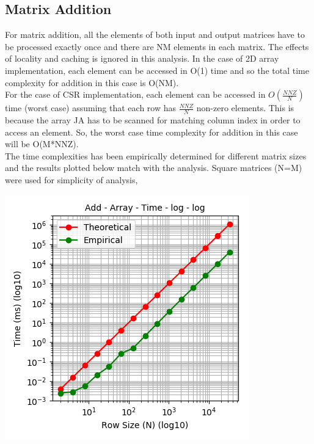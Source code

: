 \documentclass[11pt,a4paper,oneside]{article}
\begin{document}
    \subsection{Matrix Addition}
    For matrix addition, all the elements of both input and output matrices have to be processed exactly once and there are NM elements in each matrix. The effects of locality and caching is ignored in this analysis. In the case of 2D array implementation, each element can be accessed in O(1) time and so the total time complexity for addition in this case is O(NM).\\
    \newline
    For the case of CSR implementation, each element can be accessed in $O(\frac{NNZ}{N})$ time (worst case) assuming that each row has $\frac{NNZ}{N}$ non-zero elements. This is because the array JA has to be scanned for matching column index in order to access an element. So, the worst case time complexity for addition in this case will be O(M*NNZ). \\   
    \newline
    The time complexities has been empirically determined for different matrix sizes and the results plotted below match with the analysis. Square matrices (N=M) were used for simplicity of analysis,
    
    \begin{center}
    	\includegraphics[scale=0.6]{3.png}		
    \end{center}
    
\end{document}
